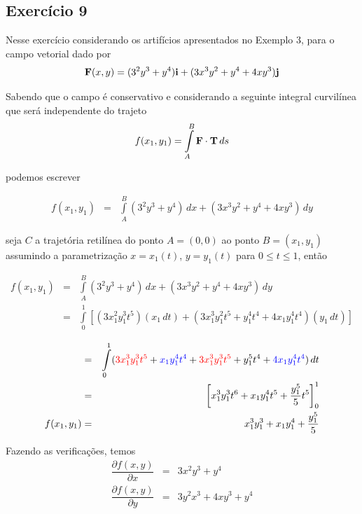 \documentclass[a4paper, 12pt, brazilian]{article}
\begin{document}
	\subsection{Exercício 9}
	
	Nesse exercício considerando os artifícios apresentados no Exemplo 3, para o campo vetorial dado por
	\begin{equation}
		\textbf{F} (x,y)=(3^{2}y^{3}+y^{4})\textbf{i}+(3x^{3}y^{2}+y^{4}+4xy^{3})\textbf{j}
	\end{equation}
	
	Sabendo que o campo é conservativo e considerando a seguinte integral curvilínea que será independente do trajeto
	\begin{equation}
		f(x_{1},y_{1})=\int\limits_{A}^{B}\textbf{F}\cdot\textbf{T}\,ds
	\end{equation}
	
	podemos escrever
	
	\begin{eqnarray}
		f(x_{1},y_{1})&=&\int\limits_{A}^{B}(3^{2}y^{3}+y^{4})\,dx+(3x^{3}y^{2}+y^{4}+4xy^{3})\,dy
	\end{eqnarray}
	
	seja $C$ a trajetória retilínea do ponto $A=(0,0)$ ao ponto $B=(x_{1},y_{1})$ assumindo a parametrização $x=x_{1}(t)$, $y=y_{1}(t)$ para $0\leq t\leq 1$, então
	
	\begin{eqnarray}
	f(x_{1},y_{1})&=&\int\limits_{A}^{B}(3^{2}y^{3}+y^{4})\,dx+(3x^{3}y^{2}+y^{4}+4xy^{3})\,dy\\
	&=&\int\limits_{0}^{1}[(3x_{1}^{2}y_{1}^{3}t^{5})(x_{1}\,dt)+(3x_{1}^{3}y_{1}^{2}t^{5}+y_{1}^{4}t^{4}+4x_{1}y_{1}^{4}t^{4})(y_{1}\,dt)]
	\end{eqnarray}
	
	\begin{eqnarray}
		&=&\int\limits_{0}^{1}(\textcolor{red}{3x_{1}^{3}y_{1}^{3}t^{5}}+\textcolor{blue}{x_{1}y_{1}^{4}t^{4}}+\textcolor{red}{3x_{1}^{3}y_{1}^{3}t^{5}}+y_{1}^{5}t^{4}+\textcolor{blue}{4x_{1}y_{1}^{4}t^{4}})\,dt\\
		&=&\left[x_{1}^{3}y_{1}^{3}t^{6}+x_{1}y_{1}^{4}t^{5}+\dfrac{y_{1}^{5}}{5}t^{5}\right]_{0}^{1}\\
		f(x_{1},y_{1})&=&x_{1}^{3}y_{1}^{3}+x_{1}y_{1}^{4}+\dfrac{y_{1}^{5}}{5}
	\end{eqnarray}
	
	Fazendo as verificações, temos
	\begin{eqnarray}
		\dfrac{\partial f(x,y)}{\partial x}&=&3x^{2}y^{3}+y^{4}\\
		\dfrac{\partial f(x,y)}{\partial y}&=&3y^{2}x^{3}+4xy^{3}+y^{4}
	\end{eqnarray}
	
\end{document}
